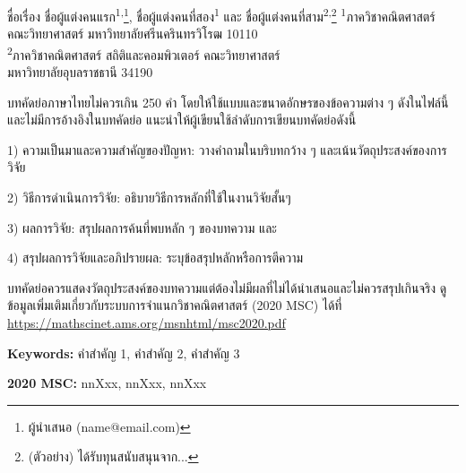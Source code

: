 \documentclass[12pt, a4paper, twoside]{article}
\newenvironment{AMM-abstractTH}[4][]{
  \begin{center}
    { \renewcommand\textsuperscript[1]{}\par}
    {{\Large\bfseries #2}\par}
    \medskip
    {\large #3\par}
    \bigskip
    {\small #4\par}
    \bigskip\bigskip
    {{\large\bfseries บทคัดย่อ}\par}
  \end{center}
}{ 
    \bigskip
    \hrule
    \bigskip
}
\newcommand{\mykeywordsTH}[1]{%
    \noindent \textbf{Keywords:} #1 \par
}
\newcommand{\myMSC}[1]{
    \noindent \textbf{2020 MSC:} #1 \par
}
\theoremstyle{plain}
\theoremstyle{definition}
\theoremstyle{remark}
\numberwithin{equation}{section}
\begin{document}
\setcounter{section}{0}


%
%

\begin{AMM-abstractTH}[]
{ชื่อเรื่อง} %
{ชื่อผู้แต่งคนแรก\textsuperscript{1,}\footnote{ผู้นำเสนอ (name@email.com)}, ชื่อผู้แต่งคนที่สอง\textsuperscript{1}
และ ชื่อผู้แต่งคนที่สาม\textsuperscript{2,}\footnote{(ตัวอย่าง) ได้รับทุนสนับสนุนจาก...}} %
{\textsuperscript{1}ภาควิชาคณิตศาสตร์ คณะวิทยาศาสตร์
มหาวิทยาลัยศรีนครินทรวิโรฒ 10110\\ \smallskip
\textsuperscript{2}ภาควิชาคณิตศาสตร์ สถิติและคอมพิวเตอร์ คณะวิทยาศาสตร์ \\ มหาวิทยาลัยอุบลราชธานี 34190} %

บทคัดย่อภาษาไทยไม่ควรเกิน 250 คำ 
โดยให้ใช้แบบและขนาดอักษรของข้อความต่าง ๆ ดังในไฟล์นี้ 
และไม่มีการอ้างอิงในบทคัดย่อ แนะนำให้ผู้เขียนใช้ลำดับการเขียนบทคัดย่อดังนี้  

1) ความเป็นมาและความสำคัญของปัญหา: วางคำถามในบริบทกว้าง ๆ และเน้นวัตถุประสงค์ของการวิจัย 

2) วิธีการดำเนินการวิจัย: อธิบายวิธีการหลักที่ใช้ในงานวิจัยสั้นๆ 

3) ผลการวิจัย: สรุปผลการค้นที่พบหลัก ๆ ของบทความ และ 

4) สรุปผลการวิจัยและอภิปรายผล: ระบุข้อสรุปหลักหรือการตีความ 

บทคัดย่อควรแสดงวัตถุประสงค์ของบทความแต่ต้องไม่มีผลที่ไม่ได้นำเสนอและไม่ควรสรุปเกินจริง
ดูข้อมูลเพิ่มเติมเกี่ยวกับระบบการจำแนกวิชาคณิตศาสตร์ (2020 MSC) ได้ที่ \\ \url{https://mathscinet.ams.org/msnhtml/msc2020.pdf}
\end{AMM-abstractTH}


\mykeywordsTH{คำสำคัญ 1, คำสำคัญ 2, คำสำคัญ 3} %
\smallskip
\myMSC{nnXxx, nnXxx, nnXxx} %
\end{document}
